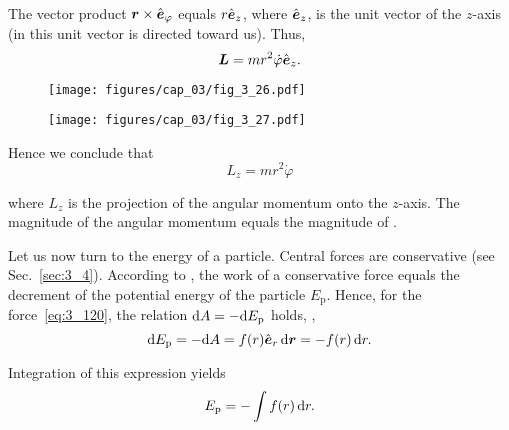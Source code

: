 \noindent
The vector product $\boldsymbol{r}\times\hat{\boldsymbol{e}}_{\varphi}$ equals $r\hat{\boldsymbol{e}}_{z}$, where $\hat{\boldsymbol{e}}_{z}$, is the unit vector of the $z$-axis (in  this unit vector is directed toward us). Thus,
\begin{equation}\label{eq:3_123}
\boldsymbol{L} = mr^2\dot{\varphi}\hat{\boldsymbol{e}}_{z}.
\end{equation}

\begin{figure}[t]
	\begin{minipage}[t]{0.5\linewidth}
		\begin{center}
			\texttt{[image: figures/cap\_03/fig\_3\_26.pdf]}
			\caption[]{}
			\label{fig:3_26}
		\end{center}
	\end{minipage}
	\hspace{-0.05cm}
	\begin{minipage}[t]{0.5\linewidth}
		\begin{center}
			\texttt{[image: figures/cap\_03/fig\_3\_27.pdf]}
			\caption[]{}
			\label{fig:3_27}
		\end{center}
	\end{minipage}
	\vspace{-0.3cm}
\end{figure}

\noindent
Hence we conclude that
\begin{equation}\label{eq:3_124}
L_z = mr^2\dot{\varphi}
\end{equation}

\noindent
where $L_z$ is the projection of the angular momentum onto the $z$-axis. The magnitude of the angular momentum equals the magnitude of .

Let us now turn to the energy of a particle. Central forces are conservative (see Sec.~\ref{sec:3_4}). According to , the work of a conservative force equals the decrement of the potential energy of the particle $E_{\text{p}}$. Hence, for the force~\eqref{eq:3_120}, the relation $\mathrm{d} A=-\mathrm{d} E_{\text{p}}$ holds, \ie,
\begin{equation*}
\mathrm{d} E_{\text{p}} = -\mathrm{d} A = f(r)\hat{\boldsymbol{e}}_{r}\,\mathrm{d}\boldsymbol{r} = -f(r)\,\mathrm{d} r.
\end{equation*}

\noindent
Integration of this expression yields
\begin{equation}\label{eq:3_125}
E_{\text{p}} = -\int f(r)\,\mathrm{d} r.
\end{equation}

